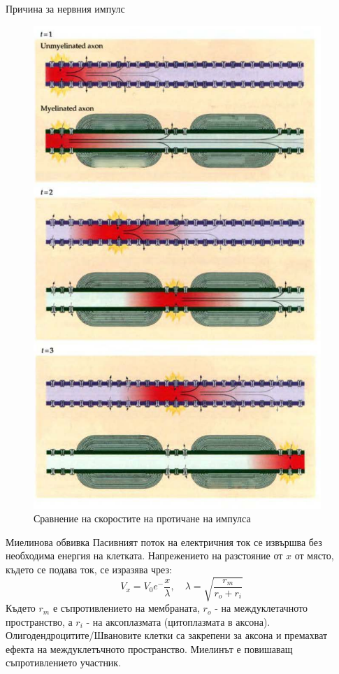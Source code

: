 \begin{frame}[t]{Причина за нервния импулс}
  \begin{figure}[htbp!]
    \centering
    \includegraphics[width=\textwidth,height=0.7\textheight,keepaspectratio]{axon-comparison.PNG}
    \caption{Сравнение на скоростите на протичане на импулса \cite[Фиг 3.14]{Neuroscience}}
  \end{figure}
\end{frame}

\begin{frame}[t]{Миелинова обвивка}
  Пасивният поток на електричния ток се извършва без необходима енергия на клетката.
  Напрежението на разстояние от $x$ от място, където се подава ток, се изразява чрез:
  \begin{equation*}
    V_x=V_0 e^-\frac{x}{\lambda}, \quad \lambda=\sqrt{\frac{r_m}{r_o+r_i}}
  \end{equation*}
  Където $r_m$ е съпротивлението на мембраната, $r_o$ - на междуклетачното пространство, а $r_i$ - на аксоплазмата (цитоплазмата в аксона).
  Олигодендроцитите/Швановите клетки са закрепени за аксона и премахват ефекта на междуклетъчното пространство.
  Миелинът е повишаващ съпротивлението участник.
\end{frame}

